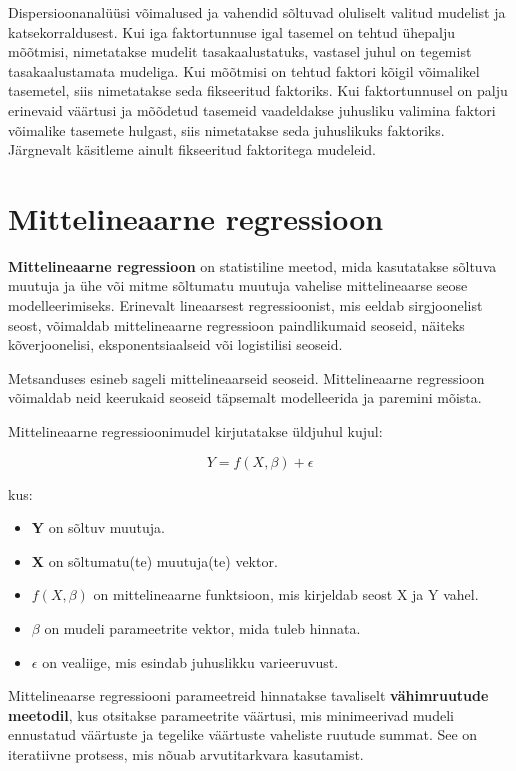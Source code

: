\documentclass[
]{book}
\providecommand{\tightlist}{%
  \setlength{\itemsep}{0pt}\setlength{\parskip}{0pt}}
\begin{document}
Dispersioonanalüüsi võimalused ja vahendid sõltuvad oluliselt valitud mudelist ja katsekorraldusest. Kui iga faktortunnuse igal tasemel on tehtud ühepalju mõõtmisi, nimetatakse mudelit tasakaalustatuks, vastasel juhul on tegemist tasakaalustamata mudeliga. Kui mõõtmisi on tehtud faktori kõigil võimalikel tasemetel, siis nimetatakse seda fikseeritud faktoriks. Kui faktortunnusel on palju erinevaid väärtusi ja mõõdetud tasemeid vaadeldakse juhusliku valimina faktori võimalike tasemete hulgast, siis nimetatakse seda juhuslikuks faktoriks. Järgnevalt käsitleme ainult fikseeritud faktoritega mudeleid.

\chapter{Mittelineaarne regressioon}\label{mittelineaarne-regressioon}

\textbf{Mittelineaarne regressioon} on statistiline meetod, mida kasutatakse sõltuva muutuja ja ühe või mitme sõltumatu muutuja vahelise mittelineaarse seose modelleerimiseks. Erinevalt lineaarsest regressioonist, mis eeldab sirgjoonelist seost, võimaldab mittelineaarne regressioon paindlikumaid seoseid, näiteks kõverjoonelisi, eksponentsiaalseid või logistilisi seoseid.

Metsanduses esineb sageli mittelineaarseid seoseid. Mittelineaarne regressioon võimaldab neid keerukaid seoseid täpsemalt modelleerida ja paremini mõista.

Mittelineaarne regressioonimudel kirjutatakse üldjuhul kujul:

\[Y = f(X, \beta) + \epsilon\]

kus:

\begin{itemize}
\tightlist
\item
  \textbf{Y} on sõltuv muutuja.
\item
  \textbf{X} on sõltumatu(te) muutuja(te) vektor.
\item
  \textbf{\(f(X, \beta)\)} on mittelineaarne funktsioon, mis kirjeldab seost X ja Y vahel.
\item
  \textbf{\(\beta\)} on mudeli parameetrite vektor, mida tuleb hinnata.
\item
  \textbf{\(\epsilon\)} on vealiige, mis esindab juhuslikku varieeruvust.
\end{itemize}

Mittelineaarse regressiooni parameetreid hinnatakse tavaliselt \textbf{vähimruutude meetodil}, kus otsitakse parameetrite väärtusi, mis minimeerivad mudeli ennustatud väärtuste ja tegelike väärtuste vaheliste ruutude summat. See on iteratiivne protsess, mis nõuab arvutitarkvara kasutamist.
\end{document}
